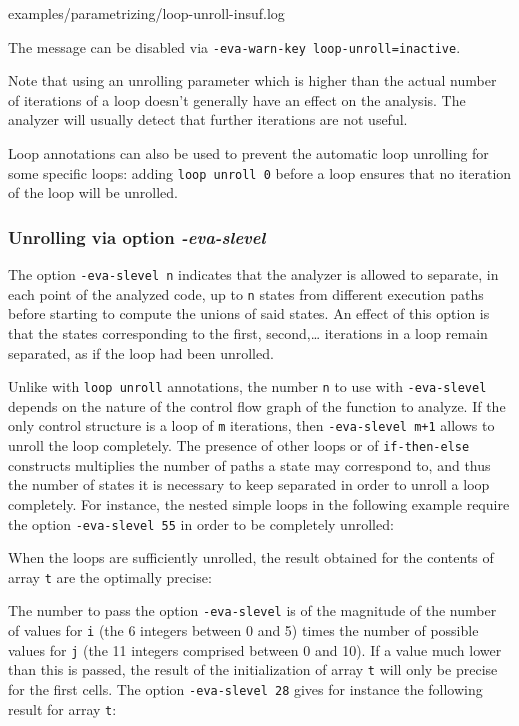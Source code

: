 \documentclass{frama-c-book}
\begin{document}

  {examples/parametrizing/loop-unroll-insuf.log}

The message can be disabled via \lstinline|-eva-warn-key loop-unroll=inactive|.

Note that using an unrolling parameter which is higher than the actual number
of iterations of a loop doesn't generally have an effect on the analysis.
The analyzer will usually detect that further iterations are not useful.

Loop annotations can also be used to prevent the automatic loop unrolling
for some specific loops: adding \lstinline|loop unroll 0| before a loop
ensures that no iteration of the loop will be unrolled.

\subsubsection{Unrolling via option {\em -eva-slevel}}
\label{slevel}

The option \lstinline|-eva-slevel n| indicates that the analyzer is allowed
to separate, in each point of the analyzed code,
up to \lstinline|n| states from different execution paths before starting
to compute the unions of said states. An effect of this option
is that the states corresponding to the first, second,\ldots
iterations in a loop remain separated, as if the loop had been unrolled.

Unlike with \lstinline|loop unroll| annotations, the number \lstinline|n|
to use with \lstinline|-eva-slevel| depends on the nature of the control flow
graph of the function to analyze.
If the only control structure is a loop of \lstinline|m| iterations,
then \texttt{-eva-slevel \textsf{m+1}} allows to unroll the loop completely.
The presence of other loops or of \lstinline|if-then-else| constructs
multiplies the number of paths a state may correspond to,
and thus the number of states it is necessary to keep separated
in order to unroll a loop completely.
For instance, the
nested simple loops in the following example require the
option \lstinline|-eva-slevel 55| in order to be completely unrolled:

When the loops are sufficiently unrolled, the result obtained for the
contents of array \lstinline|t| are the optimally precise:

The number to pass the option \lstinline|-eva-slevel|  is of the magnitude of
the number of values for \lstinline|i| (the 6 integers between 0 and 5)
times the number of possible values for \lstinline|j| (the 11
integers comprised between 0 and 10). If a value much lower than
this is passed, the result of the initialization of array \lstinline|t|
will only be precise for the first cells. The option \lstinline|-eva-slevel 28|
gives for instance the following result for array \lstinline|t|:
\end{document}
